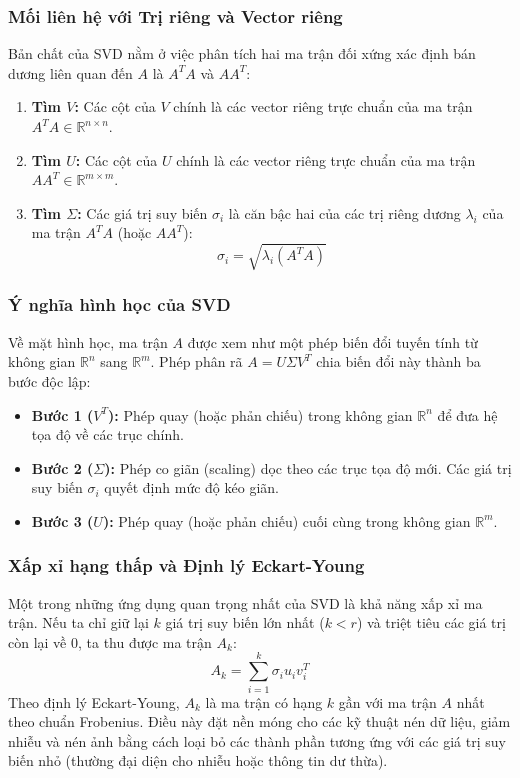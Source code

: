 \subsubsection{Mối liên hệ với Trị riêng và Vector riêng}
Bản chất của SVD nằm ở việc phân tích hai ma trận đối xứng xác định bán dương liên quan đến $A$ là $A^T A$ và $A A^T$:
\begin{enumerate}
    \item \textbf{Tìm $V$:} Các cột của $V$ chính là các vector riêng trực chuẩn của ma trận $A^T A \in \mathbb{R}^{n \times n}$.
    \item \textbf{Tìm $U$:} Các cột của $U$ chính là các vector riêng trực chuẩn của ma trận $A A^T \in \mathbb{R}^{m \times m}$.
    \item \textbf{Tìm $\Sigma$:} Các giá trị suy biến $\sigma_i$ là căn bậc hai của các trị riêng dương $\lambda_i$ của ma trận $A^T A$ (hoặc $A A^T$):
    \begin{equation}
        \sigma_i = \sqrt{\lambda_i(A^T A)}
    \end{equation}
\end{enumerate}

\subsubsection{Ý nghĩa hình học của SVD}
Về mặt hình học, ma trận $A$ được xem như một phép biến đổi tuyến tính từ không gian $\mathbb{R}^n$ sang $\mathbb{R}^m$. Phép phân rã $A = U \Sigma V^T$ chia biến đổi này thành ba bước độc lập:
\begin{itemize}
    \item \textbf{Bước 1 ($V^T$):} Phép quay (hoặc phản chiếu) trong không gian $\mathbb{R}^n$ để đưa hệ tọa độ về các trục chính.
    \item \textbf{Bước 2 ($\Sigma$):} Phép co giãn (scaling) dọc theo các trục tọa độ mới. Các giá trị suy biến $\sigma_i$ quyết định mức độ kéo giãn.
    \item \textbf{Bước 3 ($U$):} Phép quay (hoặc phản chiếu) cuối cùng trong không gian $\mathbb{R}^m$.
\end{itemize}

\subsubsection{Xấp xỉ hạng thấp và Định lý Eckart-Young}
Một trong những ứng dụng quan trọng nhất của SVD là khả năng xấp xỉ ma trận. Nếu ta chỉ giữ lại $k$ giá trị suy biến lớn nhất ($k < r$) và triệt tiêu các giá trị còn lại về 0, ta thu được ma trận $A_k$:
\begin{equation}
    A_k = \sum_{i=1}^{k} \sigma_i u_i v_i^T
\end{equation}
Theo định lý Eckart-Young, $A_k$ là ma trận có hạng $k$ gần với ma trận $A$ nhất theo chuẩn Frobenius. Điều này đặt nền móng cho các kỹ thuật nén dữ liệu, giảm nhiễu và nén ảnh bằng cách loại bỏ các thành phần tương ứng với các giá trị suy biến nhỏ (thường đại diện cho nhiễu hoặc thông tin dư thừa).


